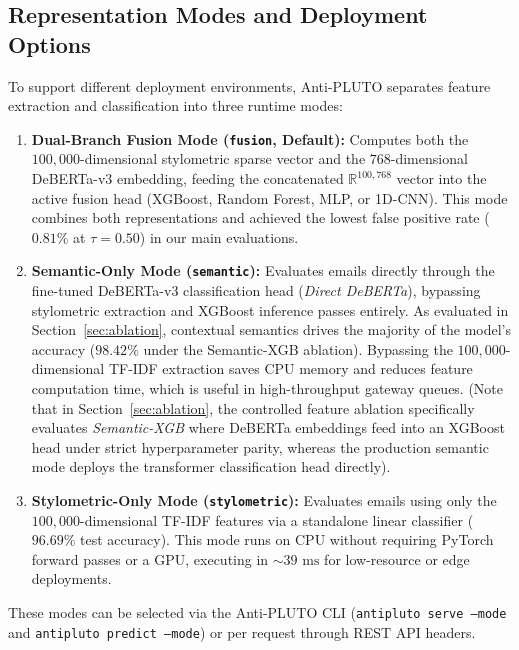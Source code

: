 \documentclass[journal]{IEEEtran}
\begin{document}
\subsection{Representation Modes and Deployment Options}
\label{sec:pluggable_modes}
To support different deployment environments, Anti-PLUTO separates feature extraction and classification into three runtime modes:
\begin{enumerate}
    \item \textbf{Dual-Branch Fusion Mode (\texttt{fusion}, Default):} Computes both the $100,000$-dimensional stylometric sparse vector and the $768$-dimensional DeBERTa-v3 embedding, feeding the concatenated $\mathbb{R}^{100,768}$ vector into the active fusion head (XGBoost, Random Forest, MLP, or 1D-CNN). This mode combines both representations and achieved the lowest false positive rate ($0.81\%$ at $\tau=0.50$) in our main evaluations.
    \item \textbf{Semantic-Only Mode (\texttt{semantic}):} Evaluates emails directly through the fine-tuned DeBERTa-v3 classification head (\emph{Direct DeBERTa}), bypassing stylometric extraction and XGBoost inference passes entirely. As evaluated in Section~\ref{sec:ablation}, contextual semantics drives the majority of the model's accuracy ($98.42\%$ under the Semantic-XGB ablation). Bypassing the $100,000$-dimensional TF-IDF extraction saves CPU memory and reduces feature computation time, which is useful in high-throughput gateway queues. (Note that in Section~\ref{sec:ablation}, the controlled feature ablation specifically evaluates \emph{Semantic-XGB} where DeBERTa embeddings feed into an XGBoost head under strict hyperparameter parity, whereas the production semantic mode deploys the transformer classification head directly).
    \item \textbf{Stylometric-Only Mode (\texttt{stylometric}):} Evaluates emails using only the $100,000$-dimensional TF-IDF features via a standalone linear classifier ($96.69\%$ test accuracy). This mode runs on CPU without requiring PyTorch forward passes or a GPU, executing in $\sim 39\text{ ms}$ for low-resource or edge deployments.
\end{enumerate}
These modes can be selected via the Anti-PLUTO CLI (\texttt{antipluto serve --mode} and \texttt{antipluto predict --mode}) or per request through REST API headers.



\end{document}
